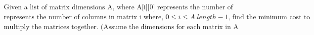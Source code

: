 \documentclass[preview]{standalone}
\begin{document}
\begin{center}
\begin{align*}&\text{Given a list of matrix dimensions A, where A[i][0] represents 
                                  the number of rows in matrix i and A[i][1]}\\&\text{represents the number of columns in matrix i where, } 
                                  0 \leq i \leq A.length - 1 \text{, find the minimum cost to}\\&\text{multiply the matrices together. 
                                  (Assume the dimensions for each matrix in A are valid for multiplication)}\end{align*}
\end{center}
\end{document}
